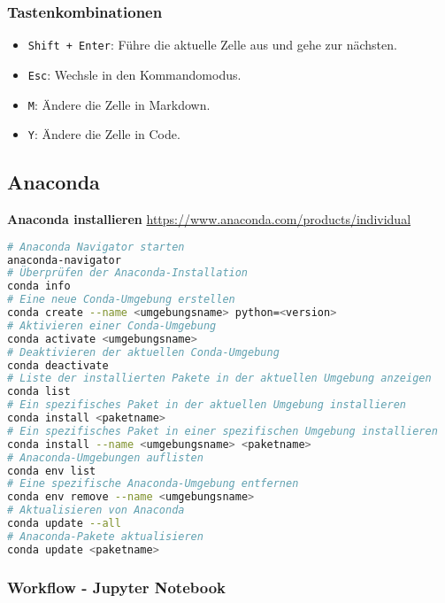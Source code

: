 \documentclass{vorlage-design-main}
\begin{document}
\hypertarget{tastenkombinationen}{%
\subsubsection{Tastenkombinationen}\label{tastenkombinationen}}

\begin{itemize}

\item
  \verb|Shift + Enter|: Führe die aktuelle Zelle aus
  und gehe zur nächsten.
\item
  \verb|Esc|: Wechsle in den Kommandomodus.
\item
  \verb|M|: Ändere die Zelle in Markdown.
\item
  \verb|Y|: Ändere die Zelle in Code.
\end{itemize}

\hypertarget{anaconda}{%
\subsection{Anaconda}\label{anaconda}}

\textbf{Anaconda installieren}
\url{https://www.anaconda.com/products/individual}

\begin{lstlisting}[language=bash]
# Anaconda Navigator starten
anaconda-navigator
# Überprüfen der Anaconda-Installation
conda info
# Eine neue Conda-Umgebung erstellen
conda create --name <umgebungsname> python=<version>
# Aktivieren einer Conda-Umgebung
conda activate <umgebungsname>
# Deaktivieren der aktuellen Conda-Umgebung
conda deactivate
# Liste der installierten Pakete in der aktuellen Umgebung anzeigen
conda list
# Ein spezifisches Paket in der aktuellen Umgebung installieren
conda install <paketname>
# Ein spezifisches Paket in einer spezifischen Umgebung installieren
conda install --name <umgebungsname> <paketname>
# Anaconda-Umgebungen auflisten
conda env list
# Eine spezifische Anaconda-Umgebung entfernen
conda env remove --name <umgebungsname>
# Aktualisieren von Anaconda
conda update --all
# Anaconda-Pakete aktualisieren
conda update <paketname>
\end{lstlisting}

\hypertarget{workflow---jupyter-notebook}{%
\subsubsection{Workflow - Jupyter
Notebook}\label{workflow---jupyter-notebook}}
\end{document}
